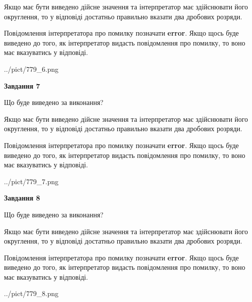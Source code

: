 \documentclass[12pt, ukrainian]{article}
\begin{document}
{\begin {Large}
Якщо має бути виведено дійсне значення та інтерпретатор має здійснювати його округлення, 
то у відповіді достатньо правильно вказати два дробових розряди.

Повідомлення інтерпретатора про помилку позначати \textbf{error}.
Якщо щось буде виведено до того, як інтерпретатор видасть повідомлення про помилку, 
то воно має вказуватись у відповіді. \par

\begin{center}
	{../pict/779_6.png}
\end{center}
\newpage

{\begin {center}\textbf{Завдання 7}\end {center}}\par
Що буде виведено за виконання? \par

Якщо має бути виведено дійсне значення та інтерпретатор має здійснювати його округлення, 
то у відповіді достатньо правильно вказати два дробових розряди.

Повідомлення інтерпретатора про помилку позначати \textbf{error}.
Якщо щось буде виведено до того, як інтерпретатор видасть повідомлення про помилку, 
то воно має вказуватись у відповіді. \par

\begin{center}
	{../pict/779_7.png}
\end{center}
\newpage

{\begin {center}\textbf{Завдання 8}\end {center}}\par
Що буде виведено за виконання? \par

Якщо має бути виведено дійсне значення та інтерпретатор має здійснювати його округлення, 
то у відповіді достатньо правильно вказати два дробових розряди.

Повідомлення інтерпретатора про помилку позначати \textbf{error}.
Якщо щось буде виведено до того, як інтерпретатор видасть повідомлення про помилку, 
то воно має вказуватись у відповіді. \par

\begin{center}
	{../pict/779_8.png}
\end{center}
\newpage


\end{Large}}
\end{document}
